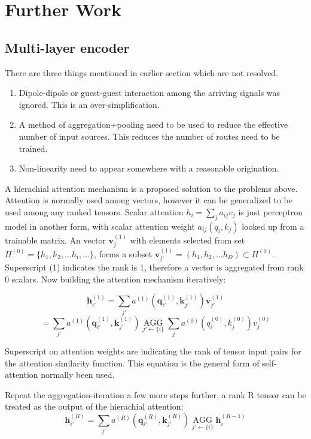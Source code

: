 \documentclass[11pt,a4paper]{article}
\begin{document}
\section{Further Work}
\begin{multicols}{2}
  \subsection{Multi-layer encoder}

  There are three things mentioned in earlier section which are not resolved. 
  \begin{enumerate}[]
    \item Dipole-dipole or guest-guest interaction among the arriving signals was ignored. This is an over-simplification.
    \item A method of aggregation+pooling need to be used to reduce the effective number of input sources. This reduces the number of routes need to be trained. 
    \item Non-linearity need to appear somewhere with a reasonable origination. 
    \end{enumerate}
  
  A hierachial attention mechanism is a proposed solution to the problems above. 
  Attention is normally used among vectors, however it can be generalized to be used among any ranked tensors. 
  Scalar attention $h_i=\sum\limits_{j} a_{ij} v_j$ is just perceptron model in another form, with scalar attention weight $a_{ij}(q_i, k_j)$ looked up from a trainable matrix. 
  An vector $\boldsymbol{v}_j^{(1)}$ with elements selected from set $H^{(0)}=\{h_1, h_2,...h_i,...\}$,  forms a subset $\boldsymbol{v}_{j'}^{(1)}=(h_1, h_2, ... h_D) \subset H^{(0)}$. Superscript (1) indicates the rank is 1, therefore a vector is aggregated from rank 0 scalars. 
  Now building the attention mechanism iteratively:

  $$
  \boldsymbol{h}_{i'}^{(1)} = \sum\limits_{j'} a^{(1)}(\boldsymbol{q}_{i'}^{(1)}, \boldsymbol{k}_{j'}^{(1)}) \boldsymbol{v}_{j'}^{(1)}
  $$
  $$
  =\sum\limits_{j'} a^{(1)}(\boldsymbol{q}_{i'}^{(1)}, \boldsymbol{k}_{j'}^{(1)}) \displaystyle\mathop{AGG}\limits_{j'\leftarrow \{i\}} \sum\limits_{j} a^{(0)}(q_i^{(0)}, k_j^{(0)}) v_j^{(0)}
  $$
  
  Superscript on attention weights are indicating the rank of tensor input pairs for the attention similarity function. 
  This equation is the general form of self-attention normally been used. 

  Repeat the aggregation-iteration a few more steps further, a rank R tensor can be treated as the output of the hierachial attention:
  $$
  \boldsymbol{h}_{i'}^{(R)} = \sum\limits_{j'} a^{(R)}(\boldsymbol{q}_{i'}^{(R)}, \boldsymbol{k}_{j'}^{(R)}) \displaystyle\mathop{AGG}\limits_{j'\leftarrow \{i\}} \boldsymbol{h}_i^{(R-1)}
  $$


\end{multicols}
\end{document}
